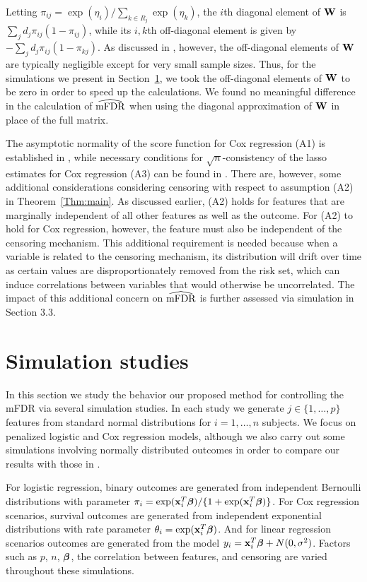 Letting $\pi_{ij} = \exp(\eta_i)/\sum_{k \in R_j}\exp(\eta_k)$, the $i$th diagonal element of $\mathbf{W}$ is $\sum_j d_j\pi_{ij}(1-\pi_{ij})$, while its $i,k$th off-diagonal element is given by $-\sum_j d_j\pi_{ij}(1-\pi_{kj})$.  As discussed in \citet{Simon2011}, however, the off-diagonal elements of $\mathbf{W}$ are typically negligible except for very small sample sizes.  Thus, for the simulations we present in Section~\ref{Sec:sim}, we took the off-diagonal elements of $\mathbf{W}$ to be zero in order to speed up the calculations.  We found no meaningful difference in the calculation of $\widehat{\textrm{mFDR}}$ when using the diagonal approximation of $\mathbf{W}$ in place of the full matrix.

The asymptotic normality of the score function for Cox regression (A1) is established in \citet{Andersen1982}, while necessary conditions for $\sqrt{n}$-consistency of the lasso estimates for Cox regression (A3) can be found in \citet{Fan_scad}.  There are, however, some additional considerations considering censoring with respect to assumption (A2) in Theorem~\ref{Thm:main}.  As discussed earlier, (A2) holds for features that are marginally independent of all other features as well as the outcome.  For (A2) to hold for Cox regression, however, the feature must also be independent of the censoring mechanism.  This additional requirement is needed because when a variable is related to the censoring mechanism, its distribution will drift over time as certain values are disproportionately removed from the risk set, which can induce correlations between variables that would otherwise be uncorrelated. The impact of this additional concern on $\widehat{\textrm{mFDR}}$ is further assessed via simulation in Section 3.3. 

\section{Simulation studies}
\label{Sec:sim}

In this section we study the behavior our proposed method for controlling the mFDR via several simulation studies. In each study we generate $j \in \{1, \ldots, p\}$ features from standard normal distributions for $i = 1, \ldots, n$ subjects. We focus on penalized logistic and Cox regression models, although we also carry out some simulations involving normally distributed outcomes in order to compare our results with those in \citet{BrehenyMFDR}.

For logistic regression, binary outcomes are generated from independent Bernoulli distributions with parameter $\pi_i = \exp(\mathbf{x}_i^T \boldsymbol{\beta})/\{1 + \exp(\mathbf{x}_i^T \boldsymbol{\beta})\}$. For Cox regression scenarios, survival outcomes are generated from independent exponential distributions with rate parameter $\theta_i = \exp(\mathbf{x}_i^T \boldsymbol{\beta})$. And for linear regression scenarios outcomes are generated from the model $y_i = \mathbf{x}_i^T\boldsymbol{\beta} + N(0,\sigma^2)$. Factors such as $p$, $n$, $\boldsymbol{\beta}$, the correlation between features, and censoring are varied throughout these simulations.


